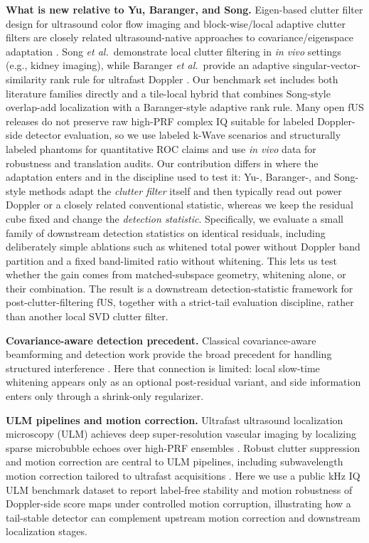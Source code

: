 \documentclass[11pt]{article}
\begin{document}
\textbf{What is new relative to Yu, Baranger, and Song.} Eigen-based clutter filter design for ultrasound color flow imaging and block-wise/local adaptive clutter filters are closely related ultrasound-native approaches to covariance/eigenspace adaptation \cite{YuLovstakkenEigenReview2010,SongBlockwiseLocal2017,CheeGPUEigen2017}. Song \emph{et al.}\ demonstrate local clutter filtering in \emph{in vivo} settings (e.g., kidney imaging), while Baranger \emph{et al.}\ provide an adaptive singular-vector-similarity rank rule for ultrafast Doppler \cite{BarangerAdaptiveSVD2018}. Our benchmark set includes both literature families directly and a tile-local hybrid that combines Song-style overlap-add localization with a Baranger-style adaptive rank rule. Many open fUS releases do not preserve raw high-PRF complex IQ suitable for labeled Doppler-side detector evaluation, so we use labeled k-Wave scenarios and structurally labeled phantoms for quantitative ROC claims and use \emph{in vivo} data for robustness and translation audits. Our contribution differs in where the adaptation enters and in the discipline used to test it: Yu-, Baranger-, and Song-style methods adapt the \emph{clutter filter} itself and then typically read out power Doppler or a closely related conventional statistic, whereas we keep the residual cube fixed and change the \emph{detection statistic}. Specifically, we evaluate a small family of downstream detection statistics on identical residuals, including deliberately simple ablations such as whitened total power without Doppler band partition and a fixed band-limited ratio without whitening. This lets us test whether the gain comes from matched-subspace geometry, whitening alone, or their combination. The result is a downstream detection-statistic framework for post-clutter-filtering fUS, together with a strict-tail evaluation discipline, rather than another local SVD clutter filter.

\textbf{Covariance-aware detection precedent.} Classical covariance-aware beamforming and detection work provide the broad precedent for handling structured interference \cite{Capon1969Beamformer,FrostBeamformer,WardSTAPTutorial,GuerciSTAPBook2003,WicksKASTAP2006,MelvinGuerciKAParadigm2006,GurramGoodmanKASTAP2006}. Here that connection is limited: local slow-time whitening appears only as an optional post-residual variant, and side information enters only through a shrink-only regularizer.

\textbf{ULM pipelines and motion correction.} Ultrafast ultrasound localization microscopy (ULM) achieves deep super-resolution vascular imaging by localizing sparse microbubble echoes over high-PRF ensembles \cite{ErricoULM2015}. Robust clutter suppression and motion correction are central to ULM pipelines, including subwavelength motion correction tailored to ultrafast acquisitions \cite{HingotULMMotion2017}. Here we use a public kHz IQ ULM benchmark dataset to report label-free stability and motion robustness of Doppler-side score maps under controlled motion corruption, illustrating how a tail-stable detector can complement upstream motion correction and downstream localization stages.
\end{document}
